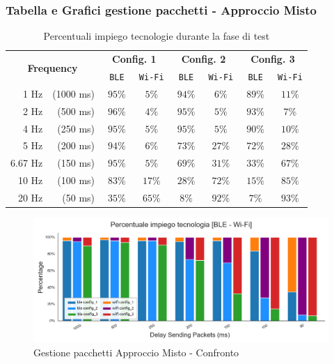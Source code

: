 \clearpage
\subsubsection{Tabella e Grafici gestione pacchetti - Approccio Misto}
\label{apex:grafici_packets}

\begin{table}[hbt!]
    \centering
    \begin{tabular}{ |rr|| c|c|| c|c|| c|c| } 
        \hline

        \multicolumn{2}{|c||}{\multirow{2}{*}{\textbf{Frequency}}} & \multicolumn{2}{|c||}{\textbf{Config. 1}} & \multicolumn{2}{|c||}{\textbf{Config. 2}} & \multicolumn{2}{|c|}{\textbf{Config. 3}} \\
        && \texttt{ BLE } & \texttt{Wi-Fi} & \texttt{ BLE } & \texttt{Wi-Fi}& \texttt{ BLE } & \texttt{Wi-Fi} \\
		\hline
		1 Hz & \scriptsize (1000 ms) & $ 95 \% $ & $ 5 \% $ & $ 94 \% $ & $ 6 \% $ & $ 89 \% $ & $ 11 \% $  \\
		\hline
		2 Hz & \scriptsize (500 ms) & $ 96 \% $ & $ 4 \% $ & $ 95 \% $ & $ 5 \% $ & $ 93 \% $ & $ 7 \% $  \\
		\hline
		4 Hz & \scriptsize (250 ms) & $ 95 \% $ & $ 5 \% $ & $ 95 \% $ & $ 5 \% $ & $ 90 \% $ & $ 10 \% $  \\
		\hline
		5 Hz & \scriptsize (200 ms) & $ 94 \% $ & $ 6 \% $ & $ 73 \% $ & $ 27 \% $ & $ 72 \% $ & $ 28 \% $  \\
		\hline
		6.67 Hz & \scriptsize (150 ms) & $ 95 \% $ & $ 5 \% $ & $ 69 \% $ & $ 31 \% $ & $ 33 \% $ & $ 67 \% $ \\
		\hline
		10 Hz & \scriptsize (100 ms) & $ 83 \% $ & $ 17 \% $ & $ 28 \% $ & $ 72 \% $ & $ 15 \% $ & $ 85 \% $  \\
		\hline
		20 Hz & \scriptsize (50 ms) & $ 35 \% $ & $ 65 \% $ & $ 8 \% $ & $ 92 \% $ & $ 7 \% $ & $ 93 \% $  \\
		\hline
    \end{tabular}
    \caption{Percentuali impiego tecnologie durante la fase di test}
    \label{tab:table_perc_ble_wifi}
\end{table}

\begin{figure}[hbt!]
    \centering
    \includegraphics[width = 1\textwidth]{images/graphs/myplot_packets.png}
    \caption{Gestione pacchetti Approccio Misto - Confronto}
    \label{graph:mix_packets_percentuage}
\end{figure}

